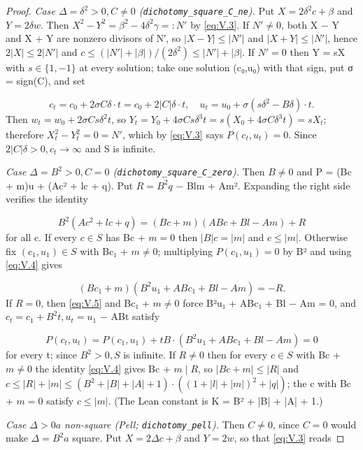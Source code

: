 \documentclass[11pt]{article}
\theoremstyle{plain}
\theoremstyle{definition}
\theoremstyle{remark}
\theoremstyle{plain}
\theoremstyle{definition}
\theoremstyle{remark}
\theoremstyle{plain}
\theoremstyle{definition}
\theoremstyle{remark}
\begin{document}
\begin{proof}
\emph{Case $Δ = δ^{2} > 0, C ≠ 0$ (\texttt{dichotomy\_\allowbreak{}square\_\allowbreak{}C\_\allowbreak{}ne}).} Put $X = 2δ^{2}c + β$ and $Y = 2δw$. Then $X^{2} − Y^{2} = β^{2} − 4δ^{2}γ =: N′$ by \eqref{eq:V.3}. If $N′ ≠ 0$, both X − Y and X + Y are nonzero divisors of N′, so $|X − Y| ≤ |N′|$ and $|X + Y| ≤ |N′|$, hence $2|X| ≤ 2|N′|$ and $c ≤ (|N′| + |β|)/(2δ^{2}) ≤ |N′| + |β|$. If $N′ = 0$ then Y = sX with $s ∈ \{1, −1\}$ at every solution; take one solution (c₀,u₀) with that sign, put σ = sign(C), and set

\[
c_{t} = c_{0} + 2σCδ·t = c_{0} + 2|C|δ·t, \quad u_{t} = u_{0} + σ(sδ^{2} − Bδ)·t.
\]
Then $w_{t} = w_{0} + 2σCsδ^{2}t$, so $Y_{t} = Y_{0} + 4σCsδ^{3}t = s(X_{0} + 4σCδ^{3}t) = sX_{t}$; therefore $X_{t}^{2} − Y_{t}^{2} = 0 = N′$, which by \eqref{eq:V.3} says $P(c_{t},u_{t}) = 0$. Since $2|C|δ > 0, c_{t} → ∞$ and S is infinite.

\emph{Case $Δ = B^{2} > 0, C = 0$ (\texttt{dichotomy\_\allowbreak{}square\_\allowbreak{}C\_\allowbreak{}zero}).} Then $B ≠ 0$ and P = (Bc + m)u + (Ac² + lc + q). Put $R = B^{2}q$ − Blm + Am². Expanding the right side verifies the identity

\begin{equation}\tag{V.4}\label{eq:V.4}
B^{2}(Ac^{2} + lc + q) = (Bc + m)(ABc + Bl − Am) + R
\end{equation}
for all c. If every $c ∈ S$ has Bc + $m = 0$ then $|B|c = |m|$ and $c ≤ |m|$. Otherwise fix $(c_{1},u_{1}) ∈ S$ with Bc₁ + $m ≠ 0$; multiplying $P(c_{1},u_{1}) = 0$ by B² and using \eqref{eq:V.4} gives

\begin{equation}\tag{V.5}\label{eq:V.5}
(Bc_{1} + m)(B^{2}u_{1} + ABc_{1} + Bl − Am) = −R.
\end{equation}
If $R = 0$, then \eqref{eq:V.5} and Bc₁ + $m ≠ 0$ force B²u₁ + ABc₁ + Bl − Am = 0, and $c_{t} = c_{1} + B^{2}t, u_{t} = u_{1}$ − ABt satisfy

\[
P(c_{t},u_{t}) = P(c_{1},u_{1}) + tB·(B^{2}u_{1} + ABc_{1} + Bl − Am) = 0
\]
for every t; since $B^{2} > 0, S$ is infinite. If $R ≠ 0$ then for every $c ∈ S$ with Bc + $m ≠ 0$ the identity \eqref{eq:V.4} gives Bc + $m ∣ R$, so $|Bc + m| ≤ |R|$ and $c ≤ |R| + |m| ≤ (B^{2} + |B| + |A| + 1)·((1 + |l| + |m|)^{2} + |q|)$; the c with Bc + $m = 0$ satisfy $c ≤ |m|$. (The Lean constant is K = B² + |B| + |A| + 1.)

\emph{Case $Δ > 0 a$ non-square (Pell; \texttt{dichotomy\_\allowbreak{}pell}).} Then $C ≠ 0$, since $C = 0$ would make $Δ = B^{2} a$ square. Put $X = 2Δc + β$ and $Y = 2w$, so that \eqref{eq:V.3} reads


\end{proof}
\end{document}

